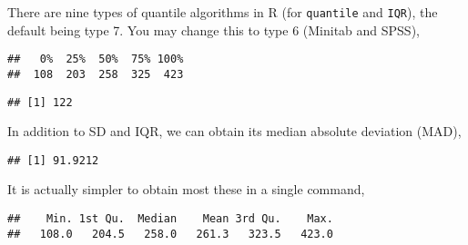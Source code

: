 \documentclass[]{book}
\newenvironment{Shaded}{\begin{snugshade}}{\end{snugshade}}
\newcommand{\KeywordTok}[1]{\textcolor[rgb]{0.13,0.29,0.53}{\textbf{{#1}}}}
\newcommand{\DataTypeTok}[1]{\textcolor[rgb]{0.13,0.29,0.53}{{#1}}}
\newcommand{\DecValTok}[1]{\textcolor[rgb]{0.00,0.00,0.81}{{#1}}}
\newcommand{\NormalTok}[1]{{#1}}
\theoremstyle{definition}
\theoremstyle{definition}
\theoremstyle{remark}
\begin{document}
There are nine types of quantile algorithms in R (for \texttt{quantile}
and \texttt{IQR}), the default being type 7. You may change this to type
6 (Minitab and SPSS),

\begin{Shaded}
\end{Shaded}

\begin{verbatim}
##   0%  25%  50%  75% 100% 
##  108  203  258  325  423
\end{verbatim}

\begin{Shaded}
\end{Shaded}

\begin{verbatim}
## [1] 122
\end{verbatim}

In addition to SD and IQR, we can obtain its median absolute deviation
(MAD),

\begin{Shaded}
\end{Shaded}

\begin{verbatim}
## [1] 91.9212
\end{verbatim}

It is actually simpler to obtain most these in a single command,

\begin{Shaded}
\end{Shaded}

\begin{verbatim}
##    Min. 1st Qu.  Median    Mean 3rd Qu.    Max. 
##   108.0   204.5   258.0   261.3   323.5   423.0
\end{verbatim}
\end{document}
